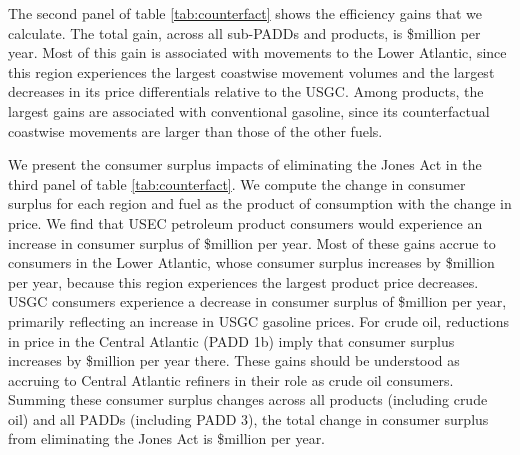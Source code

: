\documentclass[12pt]{article}
\begin{document}
The second panel of table \ref{tab:counterfact} shows the efficiency gains that we calculate. The total gain, across all sub-PADDs and products, is \$million per year. Most of this gain is associated with movements to the Lower Atlantic, since this region experiences the largest coastwise movement volumes and the largest decreases in its price differentials relative to the USGC. Among products, the largest gains are associated with conventional gasoline, since its counterfactual coastwise movements are larger than those of the other fuels.

We present the consumer surplus impacts of eliminating the Jones Act in the third panel of table \ref{tab:counterfact}. We compute the change in consumer surplus for each region and fuel as the product of consumption with the change in price. We find that USEC petroleum product consumers would experience an increase in consumer surplus of \$million per year. Most of these gains accrue to consumers in the Lower Atlantic, whose consumer surplus increases by \$million per year, because this region experiences the largest product price decreases. USGC consumers experience a decrease in consumer surplus of \$million per year, primarily reflecting an increase in USGC gasoline prices. For crude oil, reductions in price in the Central Atlantic (PADD 1b) imply that consumer surplus increases by \$million per year there. These gains should be understood as accruing to Central Atlantic refiners in their role as crude oil consumers. Summing these consumer surplus changes across all products (including crude oil) and all PADDs (including PADD 3), the total change in consumer surplus from eliminating the Jones Act is \$million per year.
\end{document}
